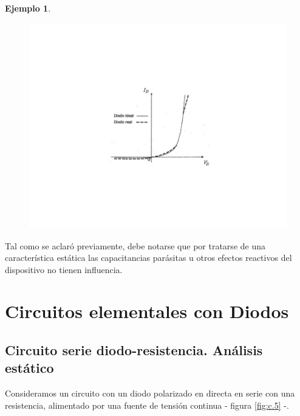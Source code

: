 \documentclass{book} %
\theoremstyle{definition}
\newtheorem{exmp}{Ejemplo}[]
\begin{document}
\begin{appendices}
\begin{exmp}
\begin{figure}[!htbp]
    \centering
    \includegraphics[scale=1]{figurac04.pdf}
    \caption{}
    \label{fig:c.4}
\end{figure}

Tal como se aclaró previamente, debe notarse que por tratarse de una característica estática las capacitancias parásitas u otros efectos reactivos del dispositivo no tienen influencia.
\end{exmp}

\section{Circuitos elementales con Diodos}

\subsection{Circuito serie diodo-resistencia. Análisis estático}

Consideramos un circuito con un diodo polarizado en directa en serie con una resistencia, alimentado por una fuente de tensión continua - figura \ref{fig:c.5} -.


\end{appendices}
\end{document}
